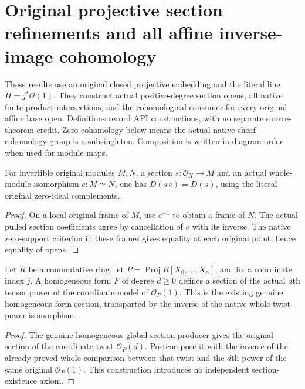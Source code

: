 \section{Original projective section refinements and all affine inverse-image cohomology}
\label{sec:projective-affine-original-inverse-cohomology}

These results use an original closed projective embedding and the literal
line $H=j^*\mathcal O(1)$. They construct actual positive-degree section
opens, all native finite product intersections, and the cohomological
consumer for every original affine base open. Definitions record API
constructions, with no separate source-theorem credit. Zero cohomology
below means the actual native sheaf cohomology group is a subsingleton.
Composition is written in diagram order when used for module maps.

\begin{lemma}
\label{lem:proj-affine-section-iso-open}
\leanok
For invertible original modules $M,N$, a section $s:\mathcal O_X\to M$
and an actual whole-module isomorphism $e:M\simeq N$, one has
$D(s\,e)=D(s)$, using the literal original zero-ideal complements.
\end{lemma}
\begin{proof}
On a local original frame of $M$, use $e^{-1}$ to obtain a frame of
$N$. The actual pulled section coefficients agree by cancellation of
$e$ with its inverse. The native zero-support criterion in these
frames gives equality at each original point, hence equality of opens.
\end{proof}

\begin{definition}
\label{def:proj-affine-homogeneous-power-section}
\leanok
Let $R$ be a commutative ring, let
$P=\operatorname{Proj}R[X_0,\ldots,X_n]$, and fix a coordinate index
$j$. A homogeneous form $F$ of degree $d\geq0$ defines a section of
the actual $d$th tensor power of the coordinate model of
$\mathcal O_P(1)$.
This is the existing genuine homogeneous-form section, transported by
the inverse of the native whole twist-power isomorphism.
\end{definition}
\begin{proof}
The genuine homogeneous global-section producer gives the original
section of the coordinate twist $\mathcal O_P(d)$. Postcompose it
with the inverse of the already proved whole comparison between that
twist and the $d$th power of the same original $\mathcal O_P(1)$.
This construction introduces no independent section-existence axiom.
\end{proof}

